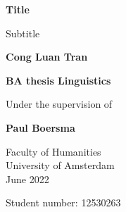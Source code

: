 \begin{titlepage}
    \begin{center}
        \vspace*{1cm}
        
        \Huge
        \textbf{Title}
            
        \vspace{0.5cm}
        \LARGE
        Subtitle
            
        \vspace{1.5cm}
            
        \textbf{Cong Luan Tran}
            
        \vfill
        \LARGE
        \textbf{BA thesis Linguistics}\\
        
        \vspace{0.5cm}
        
        \Large 
        Under the supervision of 
        
        \vspace{0.5cm}
        \LARGE
        \textbf{Paul Boersma}
        
        \vspace{0.8cm}
            
            
        \Large
        Faculty of Humanities\\
        University of Amsterdam\\
        June 2022
        
        \vfill
    \end{center}
\begin{flushright}
Student number: 12530263
\end{flushright}
\end{titlepage}